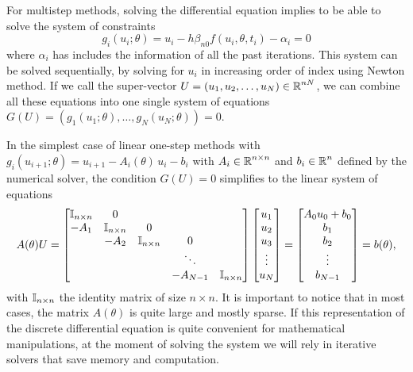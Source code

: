 For multistep methods, solving the differential equation implies to be able to solve the system of constraints
\begin{equation}
    g_i(u_i; \theta) = u_i - h \beta_{n0} f(u_i, \theta, t_i) - \alpha_i = 0
\end{equation}
where $\alpha_i$ has includes the information of all the past iterations. 
This system can be solved sequentially, by solving for $u_i$ in increasing order of index using Newton method. 
If we call the super-vector $U = (u_1, u_2, \ldots, u_N) \in \operatorname{\mathbb{R}}^{nN}$, we can combine all these equations into one single system of equations $G(U) = (g_1(u_1; \theta), \ldots, g_N(u_N; \theta)) = 0$.

In the simplest case of linear one-step methods with $g_i (u_{i+1}; \theta) = u_{i+1} - A_i (\theta) \, u_i - b_i$ with $A_i \in \operatorname{\mathbb{R}}^{n \times n}$ and $b_i \in \operatorname{\mathbb{R}}^n$ defined by the numerical solver, the condition $G(U)=0$ simplifies to the linear system of equations 
\begin{equation}
    A(\theta) U 
    = 
    \begin{bmatrix}
        \operatorname{\mathbb{I}}_{n \times n} & 0 &   &  & \\
        -A_1 & \operatorname{\mathbb{I}}_{n \times n} & 0 &  &  \\
          & -A_2 & \operatorname{\mathbb{I}}_{n \times n} & 0 &  \\
         &  &   & \ddots &   \\
         &  &  & -A_{N-1} & \operatorname{\mathbb{I}}_{n \times n}
    \end{bmatrix}
    \begin{bmatrix}
        u_1 \\
        u_2 \\
        u_3 \\
        \vdots \\
        u_N
    \end{bmatrix}
    = 
    \begin{bmatrix}
        A_0 u_0 + b_0 \\
        b_1 \\
        b_2 \\
        \vdots \\
        b_{N-1}
    \end{bmatrix}
    = 
    b(\theta), 
\end{equation}
with $\operatorname{\mathbb{I}}_{n \times n}$ the identity matrix of size $n \times n$.
It is important to notice that in most cases, the matrix $A(\theta)$ is quite large and mostly sparse. 
If this representation of the discrete differential equation is quite convenient for mathematical manipulations, at the moment of solving the system we will rely in iterative solvers that save memory and computation. 

